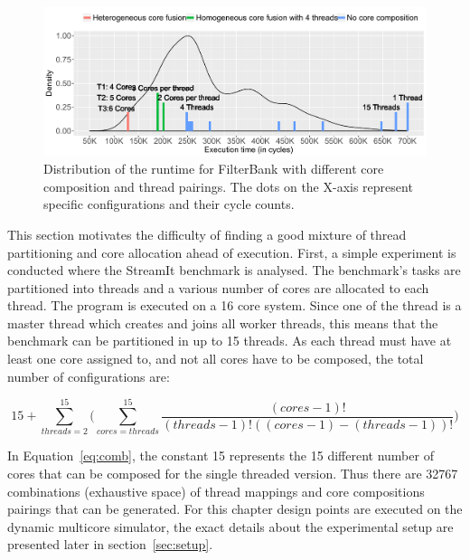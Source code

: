 
\begin{figure}[t]
    \centering
    \includegraphics[width=1\textwidth]{streamit-paper/graphics/filterbank_motivation_2.pdf}
    \caption{Distribution of the runtime for FilterBank with different core composition and thread pairings. The dots on the X-axis represent specific configurations and their cycle counts.}
     \label{fig:threadcoremotiv}
\end{figure}

This section motivates the difficulty of finding a good mixture of thread partitioning and core allocation ahead of execution.
First, a simple experiment is conducted where the  StreamIt benchmark is analysed.
The benchmark's tasks are partitioned into threads and a various number of cores are allocated to each thread.
The program is executed on a 16 core system.
Since one of the thread is a master thread which creates and joins all worker threads, this means that the benchmark can be partitioned in up to 15 threads.
As each thread must have at least one core assigned to, and not all cores have to be composed, the total number of configurations are:

\begin{equation}
15 + \sum_{threads=2}^{15} \bigg( \sum_{cores=threads}^{15} \frac{(cores-1)!}{(threads-1)!((cores-1)-(threads-1))!}\bigg)
\label{eq:comb}
\end{equation}

In Equation~\ref{eq:comb}, the constant 15 represents the 15 different number of cores that can be composed for the single threaded version.
Thus there are 32767 combinations (exhaustive space) of thread mappings and core compositions pairings that can be generated.
For this chapter design points are executed on the dynamic multicore simulator, the exact details about the experimental setup are presented later in section~\ref{sec:setup}.

